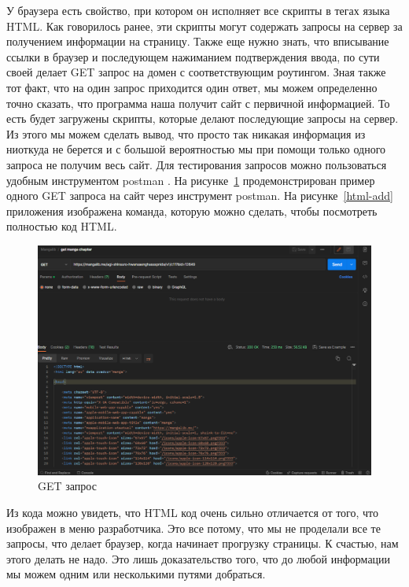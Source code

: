 У браузера есть свойство, при котором он исполняет все скрипты в тегах языка HTML. 
Как говорилось ранее, эти скрипты могут содержать запросы на сервер за получением информации на страницу.
Также еще нужно знать, что вписывание ссылки в браузер и последующем нажиманием подтверждения ввода, по сути своей делает GET запрос на домен с соответствующим роутингом.
Зная также тот факт, что на один запрос приходится один ответ, мы можем определенно точно сказать, что программа наша получит сайт с первичной информацией. 
То есть будет загружены скрипты, которые делают последующие запросы на сервер.
Из этого мы можем сделать вывод, что просто так никакая информация из ниоткуда не берется и с большой вероятностью мы при помощи только одного запроса не получим весь сайт. 
Для тестирования запросов можно пользоваться удобным инструментом postman \cite{postman-cite}.
На рисунке~\ref{postman-first-get} продемонстрирован пример одного GET запроса на сайт через инструмент postman. 
На рисунке~\ref{html-add} приложения изображена команда, которую можно сделать, чтобы посмотреть полностью код HTML.

\begin{figure}
    \includegraphics[scale=0.5]{imgs/postman-get-site}
    \caption{GET запрос }
    \label{postman-first-get}
\end{figure}

Из кода можно увидеть, что HTML код очень сильно отличается от того, что изображен в меню разработчика.
Это все потому, что мы не проделали все те запросы, что делает браузер, когда начинает прогрузку страницы.
К счастью, нам этого делать не надо. Это лишь доказательство того, что до любой информации мы можем одним или несколькими путями добраться.

